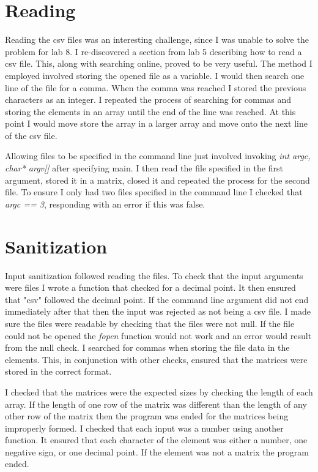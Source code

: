 \documentclass{article}
\begin{document}
\section{Reading}
Reading the csv files was an interesting challenge, since I was unable to solve the problem for lab 8. I re-discovered a section from lab 5 describing how to read a csv file. This, along with searching online, proved to be very useful. The method I employed involved storing the opened file as a variable. I would then search one line of the file for a comma. When the comma was reached I stored the previous characters as an integer. I repeated the process of searching for commas and storing the elements in an array until the end of the line was reached. At this point I would move store the array in a larger array and move onto the next line of the csv file.

Allowing files to be specified in the command line just involved invoking \textit{int argc, char* argv[]} after specifying main. I then read the file specified in the first argument, stored it in a matrix, closed it and repeated the process for the second file. To ensure I only had two files specified in the command line I checked that \textit{argc == 3}, responding with an error if this was false.


\section{Sanitization}
Input sanitization followed reading the files. To check that the input arguments were files I wrote a function that checked for a decimal point. It then ensured that "csv" followed the decimal point. If the command line argument did not end immediately after that then the input was rejected as not being a csv file. I made sure the files were readable by checking that the files were not null. If the file could not be opened the \textit{fopen} function would not work and an error would result from the null check. I searched for commas when storing the file data in the elements. This, in conjunction with other checks, ensured that the matrices were stored in the correct format.

I checked that the matrices were the expected sizes by checking the length of each array. If the length of one row of the matrix was different than the length of any other row of the matrix then the program was ended for the matrices being improperly formed. I checked that each input was a number using another function. It ensured that each character of the element was either a number, one negative sign, or one decimal point. If the element was not a matrix the program ended.
\end{document}
